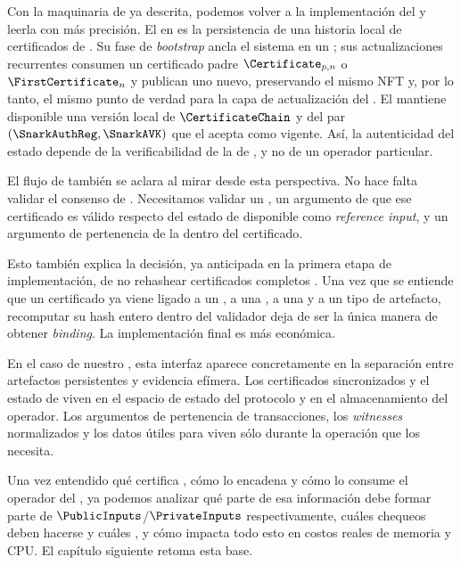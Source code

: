 
Con la maquinaria de \Mithril ya descrita, podemos volver a la implementación del \zkBridge y leerla con más precisión. El \StakeDistributionUTxO en \ChainB es la persistencia \Onchain de una historia local de certificados de \Mithril. Su fase de \textit{bootstrap} ancla el sistema en un \GenesisCertificate; sus actualizaciones recurrentes consumen un certificado padre $\Certificate_{p,n}$ o $\FirstCertificate_n$ y publican uno nuevo, preservando el mismo NFT y, por lo tanto, el mismo punto de verdad para la capa de actualización del \zkBridge. El \StakeDistributionUTxO mantiene disponible una versión local de $\CertificateChain$ y del par $(\SnarkAuthReg, \SnarkAVK)$ que el \zkBridge acepta como vigente. Así, la autenticidad del estado depende de la verificabilidad de la \CertificateChain de \Mithril, y no de un operador particular.

El flujo de \MintTx también se aclara al mirar \Mithril desde esta perspectiva. No hace falta validar el consenso de \Cardano. Necesitamos validar un \TransactionSnapshotCertificate, un argumento de que ese certificado es válido respecto del estado de \StakeDistribution disponible como \textit{reference input}, y un argumento de pertenencia de la \LockTx dentro del \TransactionSnapshot certificado.

Esto también explica la decisión, ya anticipada en la primera etapa de implementación, de no rehashear certificados completos \Onchain. Una vez que se entiende que un certificado ya viene ligado a un \ProtocolMsg, a una \SnarkAVK, a una \CertificateChain y a un tipo de artefacto, recomputar su hash entero dentro del validador deja de ser la única manera de obtener \textit{binding}. La implementación final es más económica.

En el caso de nuestro \ZkBridgeOperator, esta interfaz aparece concretamente en la separación entre artefactos persistentes y evidencia efímera. Los certificados sincronizados y el estado de \StakeDistribution viven en el espacio de estado del protocolo y en el almacenamiento del operador. Los argumentos de pertenencia de transacciones, los \textit{witnesses} normalizados y los datos útiles para \Groth viven sólo durante la operación que los necesita.

Una vez entendido qué certifica \Mithril, cómo lo encadena y cómo lo consume el operador del \zkBridge, ya podemos analizar qué parte de esa información debe formar parte de $\PublicInputs$/$\PrivateInputs$ respectivamente, cuáles chequeos deben hacerse \Onchain y cuáles \Offchain, y cómo impacta todo esto en costos reales de memoria y CPU. El capítulo siguiente retoma esta base.
